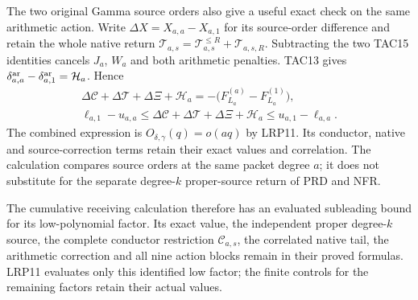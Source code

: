 The two original Gamma source orders also give a useful exact check
on the same arithmetic action. Write $\Delta X=X_{a,a}-X_{a,1}$
for its source-order difference and retain the whole native return
$\mathcal T_{a,s}=\mathcal T_{a,s}^{\le R}+\mathscr T_{a,s,R}$.
Subtracting the two TAC15 identities cancels $J_a$, $W_a$ and both
arithmetic penalties. TAC13 gives
$\delta_{a,a}^{\rm ar}-\delta_{a,1}^{\rm ar}=\mathcal H_a$.
Hence
\[
\begin{gathered}
 \Delta\mathcal C+\Delta\mathcal T+\Delta\Xi+\mathcal H_a
       =-\bigl(F_{L_a}^{(a)}-F_{L_a}^{(1)}\bigr),\\
 \ell_{a,1}-u_{a,a}
 \le\Delta\mathcal C+\Delta\mathcal T+\Delta\Xi+\mathcal H_a
 \le u_{a,1}-\ell_{a,a}.
\end{gathered}\tag{LRP18}
\]
The combined expression is $O_{\delta,\gamma}(q)=o(aq)$ by LRP11.
Its conductor, native and source-correction terms retain their exact
values and correlation. The calculation compares source orders at the
same packet degree $a$; it does not substitute for the separate
degree-$k$ proper-source return of PRD and NFR.

The cumulative receiving calculation therefore has an evaluated
subleading bound for its low-polynomial factor. Its exact value,
the independent proper degree-$k$ source, the complete conductor
restriction $\mathcal C_{a,s}$, the correlated native tail, the
arithmetic correction and all nine action blocks remain in their
proved formulas. LRP11 evaluates only this identified low factor;
the finite controls for the remaining factors retain their actual values.
\endgroup
